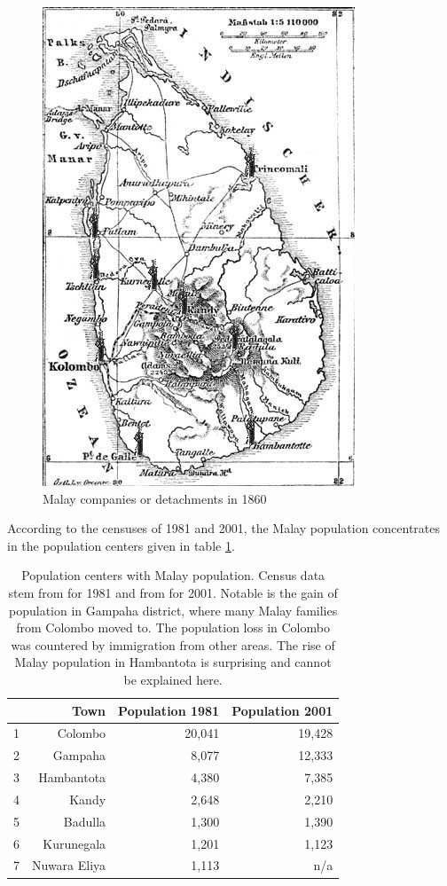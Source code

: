 \begin{figure}
    \centering
        \includegraphics[height=0.3\textheight]{pics/Malaycomp}
    \caption{Malay companies or detachments in 1860}
    \label{fig:Malaypop1860}
\end{figure}

According to the censuses of 1981 and 2001, the Malay population concentrates in the population centers given in table \ref{tab:MalayPopCtr}.
\begin{table}
    \centering
        \begin{tabular}{lrrr}
          & Town & Population 1981  & Population 2001\\
        \hline
        1 & Colombo & 20,041 & 19,428\\
        2 & Gampaha & 8,077 & 12,333\\
        3 & Hambantota & 4,380 & 7,385\\
        4 & Kandy & 2,648 & 2,210\\
        5 & Badulla & 1,300 & 1,390\\
        6 & Kurunegala & 1,201 & 1,123\\
        7 & Nuwara Eliya & 1,113 & n/a\\
        \end{tabular}
        \caption[Population centers with Malay population]{Population centers with Malay population. Census data stem from \citet{Bichsel} for 1981 and from \citet[423]{Hussein2007} for 2001. Notable is the gain of population in Gampaha district, where many Malay families from Colombo moved to. The population loss in Colombo was countered by immigration from other areas. The rise of Malay population in Hambantota is surprising and cannot be explained here.}
        \label{tab:MalayPopCtr}
\end{table}

